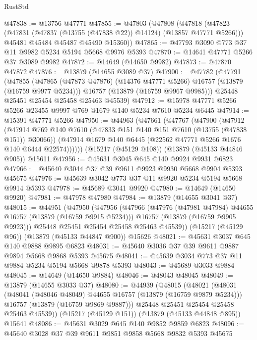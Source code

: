 \begin{lexlean}{RustStd}
\begin{coremodule}
@47838 := @13756 @47771
@47855 := @47803
    (@47808
      (@47818
        (@47823 (@47831 (@47837 (@13755 (@47838 @22)) @14124) (@13857 @47771 @5266)))
        @45481
        @45484
        @45487
        @45490
        @15360))
@47865 := @47793 @3090 @773 @37 @11 @9982 @5234 @5194 @5668 @9976 @5393
@47870 := @14641 @47771 @5266 @37 @3089 @9982
@47872 := @14649 (@14650 @9982)
@47873 := @47870 @47872
@47876 := @13879 (@14655 @3089 @37)
@47900 := @47782
    (@47791
      (@47855
        (@47865 (@47873 @47876) (@14376 @47771 @5266) @16757 (@13879 (@16759 @9977 @5234)))
        @16757
        (@13879 (@16759 @9967 @9985)))
      @25448
      @25451
      @25454
      @25458
      @25463
      @45539)
@47912 := @15978 @47771 @5266 @5266 @23455 @9997 @769 @1679 @140 @5234 @7610 @5234 @6445
@47914 := @15391 @47771 @5266
@47950 := @44963
    (@47661
      (@47767
        (@47900
          (@47912
            (@47914 @769 @140 @7610 (@47833 @151 @140 @151 @7610 (@13755 (@47838 @151)) @30066))
            (@47914 @1679 @140 @6445 (@22562 @47771 @5266 @1676 @140 @6444 @22574))))))
    (@15217 (@45129 @108))
    (@13879 (@45133 @44846 @905))
    @15611
@47956 := @45631 @3045 @645 @140 @9924 @9931 @6823
@47966 := @45640 @3044 @37 @39 @9611 @9923 @9930 @5668 @9904 @5393 @45675
@47976 := @45639 @3042 @773 @37 @11 @9920 @5234 @5194 @5668 @9914 @5393
@47978 := @45689 @3041 @9920
@47980 := @14649 (@14650 @9920)
@47981 := @47978 @47980
@47984 := @13879 (@14655 @3041 @37)
@48015 := @44951
    (@47950
      (@47956
        (@47966
          (@47976 (@47981 @47984) @44655 @16757 (@13879 (@16759 @9915 @5234)))
          @16757
          (@13879 (@16759 @9905 @9923)))
        @25448
        @25451
        @25454
        @25458
        @25463
        @45539))
    (@15217 (@45129 @96))
    (@13879 (@45133 @44847 @900))
    @15626
@48021 := @45631 @3037 @645 @140 @9888 @9895 @6823
@48031 := @45640 @3036 @37 @39 @9611 @9887 @9894 @5668 @9868 @5393 @45675
@48041 := @45639 @3034 @773 @37 @11 @9884 @5234 @5194 @5668 @9878 @5393
@48043 := @45689 @3033 @9884
@48045 := @14649 (@14650 @9884)
@48046 := @48043 @48045
@48049 := @13879 (@14655 @3033 @37)
@48080 := @44939
    (@48015
      (@48021
        (@48031
          (@48041 (@48046 @48049) @44655 @16757 (@13879 (@16759 @9879 @5234)))
          @16757
          (@13879 (@16759 @9869 @9887)))
        @25448
        @25451
        @25454
        @25458
        @25463
        @45539))
    (@15217 (@45129 @151))
    (@13879 (@45133 @44848 @895))
    @15641
@48086 := @45631 @3029 @645 @140 @9852 @9859 @6823
@48096 := @45640 @3028 @37 @39 @9611 @9851 @9858 @5668 @9832 @5393 @45675

\end{coremodule}
\end{lexlean}
